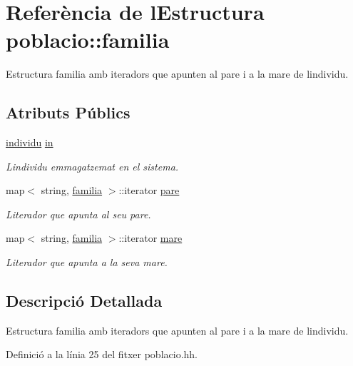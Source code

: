 \hypertarget{structpoblacio_1_1familia}{}\section{Referència de l\textquotesingle{}Estructura poblacio\+:\+:familia}
\label{structpoblacio_1_1familia}


Estructura familia amb iteradors que apunten al pare i a la mare de l\textquotesingle{}individu.  


\subsection*{Atributs Públics}
\begin{DoxyCompactItemize}
\item 
\hyperlink{classindividu}{individu} \hyperlink{structpoblacio_1_1familia_a184e9fe52d7cf62ca133ac1d900f87ea}{in}
\begin{DoxyCompactList}\small\item\em L\textquotesingle{}individu emmagatzemat en el sistema. \end{DoxyCompactList}\item 
map$<$ string, \hyperlink{structpoblacio_1_1familia}{familia} $>$\+::iterator \hyperlink{structpoblacio_1_1familia_af87f56b016ade8b4bb02a49036de5f74}{pare}
\begin{DoxyCompactList}\small\item\em L\textquotesingle{}iterador que apunta al seu pare. \end{DoxyCompactList}\item 
map$<$ string, \hyperlink{structpoblacio_1_1familia}{familia} $>$\+::iterator \hyperlink{structpoblacio_1_1familia_a9d44bf543d7f856a93feac40de233c42}{mare}
\begin{DoxyCompactList}\small\item\em L\textquotesingle{}iterador que apunta a la seva mare. \end{DoxyCompactList}\end{DoxyCompactItemize}


\subsection{Descripció Detallada}
Estructura familia amb iteradors que apunten al pare i a la mare de l\textquotesingle{}individu. 

Definició a la línia 25 del fitxer poblacio.\+hh.



